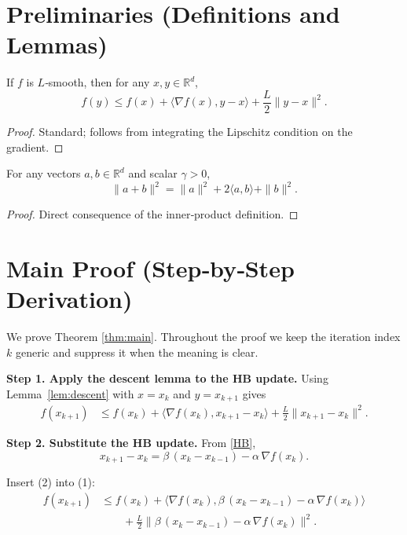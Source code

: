 \documentclass{article}
\begin{document}
\section*{Preliminaries (Definitions and Lemmas)}

\begin{lemma}\label{lem:descent}
If $f$ is $L$‑smooth, then for any $x,y\in\mathbb{R}^{d}$,
\[
f(y)\le f(x)+\langle\nabla f(x),y-x\rangle+\frac{L}{2}\|y-x\|^{2}.
\]
\end{lemma}
\begin{proof}
Standard; follows from integrating the Lipschitz condition on the gradient. \qedhere
\end{proof}

\begin{lemma}\label{lem:exp}
For any vectors $a,b\in\mathbb{R}^{d}$ and scalar $\gamma>0$,
\[
\|a+b\|^{2}= \|a\|^{2}+2\langle a,b\rangle+\|b\|^{2}.
\]
\end{lemma}
\begin{proof}
Direct consequence of the inner‑product definition. \qedhere
\end{proof}

\section*{Main Proof (Step‑by‑Step Derivation)}
We prove Theorem \ref{thm:main}.  Throughout the proof we keep the iteration index $k$ generic and suppress it when the meaning is clear.

\bigskip
\noindent\textbf{Step 1.  Apply the descent lemma to the HB update.}  
Using Lemma~\ref{lem:descent} with $x=x_{k}$ and $y=x_{k+1}$ gives
\[
\begin{aligned}
f(x_{k+1})
&\le f(x_{k})+\big\langle\nabla f(x_{k}),x_{k+1}-x_{k}\big\rangle
   +\frac{L}{2}\|x_{k+1}-x_{k}\|^{2}.
\end{aligned}
\tag{1}
\]

\noindent\textbf{Step 2.  Substitute the HB update.}  
From \eqref{HB},
\[
x_{k+1}-x_{k}= \beta\,(x_{k}-x_{k-1})-\alpha\,\nabla f(x_{k}).
\tag{2}
\]

Insert (2) into (1):
\[
\begin{aligned}
f(x_{k+1})
&\le f(x_{k})+\big\langle\nabla f(x_{k}),
      \beta\,(x_{k}-x_{k-1})-\alpha\,\nabla f(x_{k})\big\rangle\\
&\qquad+\frac{L}{2}\Big\|\beta\,(x_{k}-x_{k-1})-\alpha\,\nabla f(x_{k})\Big\|^{2}.
\end{aligned}
\tag{3}
\]
\end{document}
